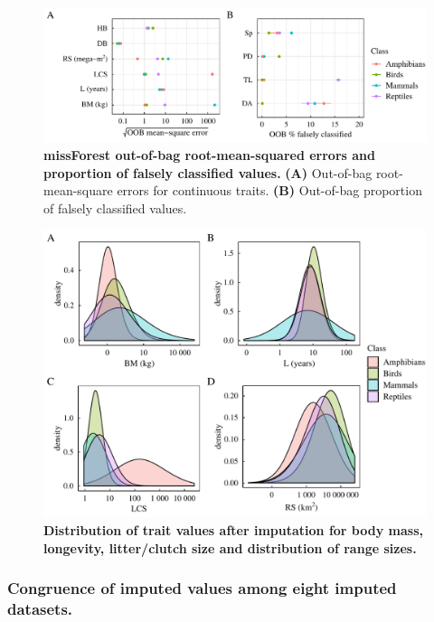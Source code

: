\begin{figure}[h!]
\centering
\includegraphics[scale=0.75]{figures/chapter2/Imputation_errors/MSE_PFC}
\caption[missForest out-of-bag root-mean-square errors and proportion of falsely classified values]{\textbf{missForest out-of-bag root-mean-squared errors and proportion of falsely classified values.} \textbf{(A)} Out-of-bag root-mean-square errors for continuous traits. \textbf{(B)} Out-of-bag proportion of falsely classified values.}
\label{OOBerrors}
\end{figure}

\begin{figure}[h!]
\centering
\includegraphics[scale=0.7]{figures/chapter2/Imputation_errors/Distributions}
\caption[Distribution of trait values after imputation for body mass, longevity, litter/clutch size and distribution of range sizes]{\textbf{Distribution of trait values after imputation for body mass, longevity, litter/clutch size and distribution of range sizes.}}
\label{traitdist}
\end{figure}


\pagebreak
\subsubsection{Congruence of imputed values among eight imputed datasets.}

